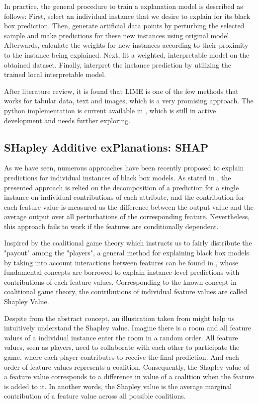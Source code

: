 In practice, the general procedure to train a explanation model is described as follows: First, select an individual instance that we desire to explain for its black box prediction. Then, generate artificial data points by perturbing the selected sample and make predictions for these new instances using original model. Afterwards, calculate the weights for new instances according to their proximity to the instance being explained. Next, fit a weighted, interpretable model on the obtained dataset. Finally, interpret the instance prediction by utilizing the trained local interpretable model. 

After literature review, it is found that LIME is one of the few methods that works for tabular data, text and images, which is a very promising approach. The python implementation is current available in \cite{lime}, which is still in active development and needs further exploring. 

\subsection{SHapley Additive exPlanations: SHAP}

As we have seen, numerous approaches have been recently proposed to explain predictions for individual instances of black box models. As stated in \cite{robnik2008explaining}, the presented approach is relied on the decomposition of a prediction for a single instance on individual contributions of each attribute, and the contribution for each feature value is measured as the difference between the output value and the average output over all perturbations of the corresponding feature. Nevertheless, this approach fails to work if the features are conditionally dependent. 

Inspired by the coalitional game theory which instructs us to fairly distribute the "payout" among the "players", a general method for explaining black box models by taking into account interactions between features can be found in \cite{kononenko2010efficient}, whose fundamental concepts are borrowed to explain instance-level predictions with contributions of each feature values. Corresponding to the known concept in coalitional game theory, the contributions of individual feature values are called Shapley Value.

Despite from the abstract concept, an illustration taken from \cite{molnar2019} might help us intuitively understand the Shapley value. Imagine there is a room and all feature values of a individual instance enter the room in a random order. All feature values, seen as players, need to collaborate with each other to participate the game, where each player contributes to receive the final prediction. And each order of feature values represents a coalition. Consequently, the Shapley value of a feature value corresponds to a difference in value of a coalition when the feature is added to it. In another words, the Shapley value is the average marginal contribution of a feature value across all possible coalitions. 

